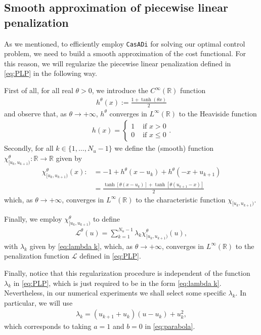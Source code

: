 \documentclass[twocolumn]{autart}    %
\begin{document}
\subsection{Smooth approximation of piecewise linear penalization}

As we mentioned, to efficiently employ \texttt{CasADi} for solving our optimal control problem, we need to build a smooth approximation of the cost functional. For this reason, we will regularize the piecewise linear penalization defined in \eqref{eq:PLP} in the following way.

First of all, for all real $\theta>0$, we introduce the $C^\infty(\mathbb{R})$ function
\begin{align*}
	\displaystyle h^\theta(x) := \frac{1 + \tanh(\theta x)}{2}
\end{align*}
and observe that, as $\theta\to +\infty$, $h^\theta$ converges in $L^\infty(\mathbb{R})$ to the Heaviside function 
\begin{align*}
    h(x) = \begin{cases}
        1 & \text{ if } x > 0 
        \\
		0 & \text{ if } x \leq 0
    \end{cases}.
\end{align*}
Secondly, for all $k \in \{1,\dots,N_u-1\}$ we define the (smooth) function $\chi_{[u_k,u_{k+1})}^\theta:\mathbb{R} \rightarrow \mathbb{R}$ given by
\begin{align*}
	\chi_{[u_k,u_{k+1})}^\theta(x) :&= - 1 + h^\theta(x-u_k) + h^\theta(-x+u_{k+1}) 
	\\[5pt]
	&= \frac{\tanh[\theta(x-u_k)] + \tanh[\theta (u_{k+1}-x)]}{2}
\end{align*}
which, as $\theta\to +\infty$, converges in $L^\infty(\mathbb{R})$ to the characteristic function $\chi_{[u_k,u_{k+1})}$.

Finally, we employ $\chi_{[u_k,u_{k+1})}^\theta$ to define
\begin{align}\label{eq:Lsmooth}
	\mathcal{L}^\theta(u) = \sum_{k = 1}^{N_u-1} \lambda_k \chi^\theta_{[u_k,u_{k+1})}(u),
\end{align}
with $\lambda_k$ given by \eqref{eq:lambda k}, which, as $\theta\to +\infty$, converges in $L^\infty(\mathbb{R})$ to the penalization function $\mathcal L$ defined in \eqref{eq:PLP}.

Finally, notice that this regularization procedure is independent of the function $\lambda_k$ in \eqref{eq:PLP}, which is just required to be in the form \eqref{eq:lambda k}. Nevertheless, in our numerical experiments we shall select some specific $\lambda_k$. In particular, we will use 
\begin{gather}
	\lambda_k = (u_{k+1}+u_{k}) (u-u_k) + u_k^2, 
\end{gather}
which corresponds to taking $a=1$ and $b=0$ in \eqref{eq:parabola}.
\end{document}

